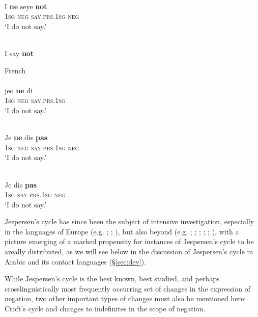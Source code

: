 \documentclass[output=paper]{langsci/langscibook}
\begin{document}
\\
\gll I \textbf{ne} seye \textbf{not}\\
     \textsc{1sg}  \textsc{neg} \textsc{\textup{say.}}\textsc{prs.1sg} \textsc{neg}  \\
\glt ‘I do not say.’


\\
 I say \textbf{not}\\
\z
\z

\ea\label{ex:key:fr}
{French \citep[7]{Jespersen1917}}\\
\\
\gll jeo \textbf{ne} di\\
     \textsc{1sg} \textsc{neg} \textsc{\textup{say}}.\textsc{prs.1sg}  \\
\glt  ‘I do not say.’

\\
\gll Je \textbf{ne} dis \textbf{pas}\\
     \textsc{1sg} \textsc{neg} \textsc{\textup{say}}.\textsc{prs.1sg} \textsc{neg}  \\
\glt ‘I do not say.’

\\
\gll Je dis \textbf{pas}\\
     \textsc{1sg} \textsc{\textup{say}}.\textsc{prs.1sg} \textsc{neg}  \\
\glt ‘I do not say.’
\z
\z

Jespersen’s cycle has since been the subject of intensive investigation, especially in the languages of Europe (e.g. \citealt{BerniniRamat1992}; \citeyear{BerniniRamat1996}; \citealt{WillisBreitbarth2013}), but also beyond (e.g. \citealt{Lucas2007}; \citeyear{Lucas2009,Lucas2013}; \citealt{LucasLash2010}; \citealt{DevosAuwera2013}; \citealt{AuweraVossen2015}; \citeyear{AuweraVossen2016,AuweraVossen2017}), with a picture emerging of a marked propensity for instances of Jespersen’s cycle to be areally distributed, as we will see below in the discussion of Jespersen’s cycle in Arabic and its contact languages (§\ref{sec:dev}).

While Jespersen’s cycle is the best known, best studied, and perhaps crosslinguistically most frequently occurring set of changes in the expression of negation, two other important types of changes must also be mentioned here: Croft’s cycle and changes to indefinites in the scope of negation.
\end{document}
